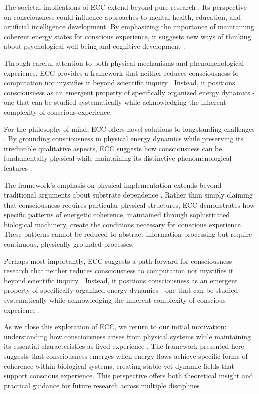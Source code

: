 The societal implications of ECC extend beyond pure research \cite{feinberg2016ancient}. Its perspective on consciousness could influence approaches to mental health, education, and artificial intelligence development. By emphasizing the importance of maintaining coherent energy states for conscious experience, it suggests new ways of thinking about psychological well-being and cognitive development \cite{zahavi2014self}.

Through careful attention to both physical mechanisms and phenomenological experience, ECC provides a framework that neither reduces consciousness to computation nor mystifies it beyond scientific inquiry \cite{merleau2012phenomenology}. Instead, it positions consciousness as an emergent property of specifically organized energy dynamics - one that can be studied systematically while acknowledging the inherent complexity of conscious experience.

For the philosophy of mind, ECC offers novel solutions to longstanding challenges \cite{pigliucci2013philosophy}. By grounding consciousness in physical energy dynamics while preserving its irreducible qualitative aspects, ECC suggests how consciousness can be fundamentally physical while maintaining its distinctive phenomenological features \cite{block2009comparing}.

The framework's emphasis on physical implementation extends beyond traditional arguments about substrate dependence \cite{noe2009out}. Rather than simply claiming that consciousness requires particular physical structures, ECC demonstrates how specific patterns of energetic coherence, maintained through sophisticated biological machinery, create the conditions necessary for conscious experience \cite{koch2019feeling}. These patterns cannot be reduced to abstract information processing but require continuous, physically-grounded processes.

Perhaps most importantly, ECC suggests a path forward for consciousness research that neither reduces consciousness to computation nor mystifies it beyond scientific inquiry \cite{chalmers2010character}. Instead, it positions consciousness as an emergent property of specifically organized energy dynamics - one that can be studied systematically while acknowledging the inherent complexity of conscious experience \cite{seth2021being}.

As we close this exploration of ECC, we return to our initial motivation: understanding how consciousness arises from physical systems while maintaining its essential characteristics as lived experience \cite{goff2019galileo}. The framework presented here suggests that consciousness emerges when energy flows achieve specific forms of coherence within biological systems, creating stable yet dynamic fields that support conscious experience. This perspective offers both theoretical insight and practical guidance for future research across multiple disciplines \cite{thompson2014waking}.

